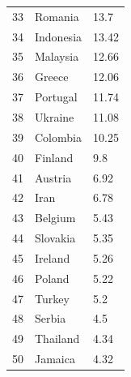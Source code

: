 \documentclass[energies,article,submit,moreauthors,pdftex]{Definitions/mdpi}
\begin{document}
\begin{tabular}{@{}p{0.5cm}<{}@{}p{9cm}<{\dotfill}@{}p{\dimexpr\linewidth-4cm}@{}}
33 & Romania & 13.7\\
34 & Indonesia & 13.42\\
35 & Malaysia & 12.66\\
36 & Greece & 12.06\\
37 & Portugal & 11.74\\
38 & Ukraine & 11.08\\
39 & Colombia & 10.25\\
40 & Finland & 9.8\\
41 & Austria & 6.92\\
42 & Iran & 6.78\\
43 & Belgium & 5.43\\
44 & Slovakia & 5.35\\
45 & Ireland & 5.26\\
46 & Poland & 5.22\\
47 & Turkey & 5.2\\
48 & Serbia & 4.5\\
49 & Thailand & 4.34\\
50 & Jamaica & 4.32\\
\end{tabular}



\end{document}
